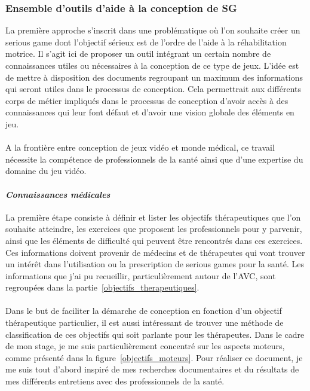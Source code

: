 	\subsubsection{Ensemble d'outils d'aide à la conception de SG} \label{boite_outils}
	La première approche s'inscrit dans une problématique où l'on souhaite créer un serious game dont l'objectif sérieux est de l'ordre de l'aide à la réhabilitation motrice. Il s'agit ici de proposer un outil intégrant un certain nombre de connaissances utiles ou nécessaires à la conception de ce type de jeux. L'idée est de mettre à disposition des documents regroupant un maximum des informations qui seront utiles dans le processus de conception. Cela permettrait aux différents corps de métier impliqués dans le processus de conception d'avoir accès à des connaissances qui leur font défaut et d'avoir une vision globale des éléments en jeu.
	
		\paragraph{}
A la frontière entre conception de jeux vidéo et monde médical, ce travail nécessite la compétence de professionnels de la santé ainsi que d’une expertise du domaine du jeu vidéo.
			\paragraph{\emph{Connaissances médicales}\\}
La première étape consiste à définir et lister les objectifs thérapeutiques que l’on souhaite atteindre, les exercices que proposent les professionnels pour y parvenir, ainsi que les éléments de difficulté qui peuvent être rencontrés dans ces exercices. Ces informations doivent provenir de médecins et de thérapeutes qui vont trouver un intérêt dans l’utilisation ou la prescription de serious games pour la santé. Les informations que j'ai pu recueillir, particulièrement autour de l'AVC, sont regroupées dans la partie~\ref{objectifs_therapeutiques}.

\paragraph{}
Dans le but de faciliter la démarche de conception en fonction d’un objectif thérapeutique particulier, il est aussi intéressant de trouver une méthode de classification de ces objectifs qui soit parlante pour les thérapeutes. Dans le cadre de mon stage, je me suis particulièrement concentré sur les aspects moteurs, comme présenté dans la figure~\ref{objectifs_moteurs}. Pour réaliser ce document, je me suis tout d'abord inspiré de mes recherches documentaires et du résultats de mes différents entretiens avec des professionnels de la santé.

